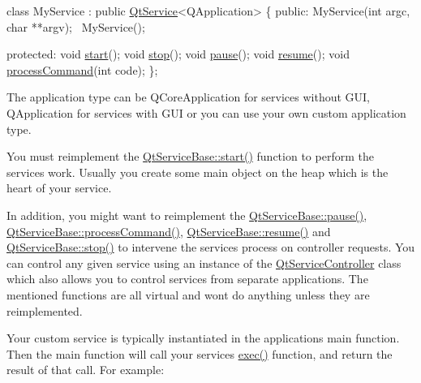 \begin{DoxyCode}
\textcolor{keyword}{class }MyService : \textcolor{keyword}{public} \mbox{\hyperlink{class_qt_service}{QtService}}<QApplication>
\{
\textcolor{keyword}{public}:
    MyService(\textcolor{keywordtype}{int} argc, \textcolor{keywordtype}{char} **argv);
    ~MyService();

\textcolor{keyword}{protected}:
    \textcolor{keywordtype}{void} \mbox{\hyperlink{class_qt_service_base_adbc0cd621b41bd3a6a1f62fda432e9e4}{start}}();
    \textcolor{keywordtype}{void} \mbox{\hyperlink{class_qt_service_base_a8d52c1b8fd06b50bdc0a0c6f9936a68e}{stop}}();
    \textcolor{keywordtype}{void} \mbox{\hyperlink{class_qt_service_base_a43215a7c5c047d30bcf4f697e6691f89}{pause}}();
    \textcolor{keywordtype}{void} \mbox{\hyperlink{class_qt_service_base_aaa2e05ef1c36283b6b35348c3972b489}{resume}}();
    \textcolor{keywordtype}{void} \mbox{\hyperlink{class_qt_service_base_a47485f00f6eba0758d2ffc75092295cf}{processCommand}}(\textcolor{keywordtype}{int} code);
\};
\end{DoxyCode}


The application type can be Q\+Core\+Application for services without G\+UI, Q\+Application for services with G\+UI or you can use your own custom application type.

You must reimplement the \mbox{\hyperlink{class_qt_service_base_adbc0cd621b41bd3a6a1f62fda432e9e4}{Qt\+Service\+Base\+::start()}} function to perform the service\textquotesingle{}s work. Usually you create some main object on the heap which is the heart of your service.

In addition, you might want to reimplement the \mbox{\hyperlink{class_qt_service_base_a43215a7c5c047d30bcf4f697e6691f89}{Qt\+Service\+Base\+::pause()}}, \mbox{\hyperlink{class_qt_service_base_a47485f00f6eba0758d2ffc75092295cf}{Qt\+Service\+Base\+::process\+Command()}}, \mbox{\hyperlink{class_qt_service_base_aaa2e05ef1c36283b6b35348c3972b489}{Qt\+Service\+Base\+::resume()}} and \mbox{\hyperlink{class_qt_service_base_a8d52c1b8fd06b50bdc0a0c6f9936a68e}{Qt\+Service\+Base\+::stop()}} to intervene the service\textquotesingle{}s process on controller requests. You can control any given service using an instance of the \mbox{\hyperlink{class_qt_service_controller}{Qt\+Service\+Controller}} class which also allows you to control services from separate applications. The mentioned functions are all virtual and won\textquotesingle{}t do anything unless they are reimplemented.

Your custom service is typically instantiated in the application\textquotesingle{}s main function. Then the main function will call your service\textquotesingle{}s \mbox{\hyperlink{class_qt_service_base_afae2e589de71c1ae3ae8db3dc9ab9c64}{exec()}} function, and return the result of that call. For example\+:


